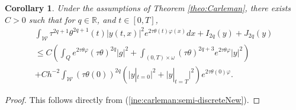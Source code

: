 \documentclass{amsart}
\numberwithin{equation}{section}
\newtheorem{corollary}[theorem]{Corollary}
\begin{document}
\begin{corollary}\label{ine:Carleman:semi-discreteNew2}
Under the assumptions of Theorem \ref{theo:Carleman}, there exists $C>0$ such that for $q\in\mathbb{R}$, and $t\in [0,T]$,
\begin{multline*}
    \int_{\mathcal{W}}\tau^{2q+1}\theta^{2q+1}\left(t\right)\left|y\left(t,x\right)\right|^2e^{2\tau\theta(t)\varphi(x)}dx+I_{2q}(y)+J_{2q}(y)
    \\
    \leq  C\left(\int_Qe^{2\tau\theta\varphi}(\tau\theta)^{2q}|g|^2+\int_{(0,T)\times\omega}(\tau\theta)^{2q+3}e^{2\tau\theta\varphi}|y|^2\right) \\
    +Ch^{-2}\int_{\mathcal{W}} (\tau\theta(0))^{2q}\left(\Big|y|_{t=0}\Big|^2+\Big|y|_{t=T}\Big|^2\right)e^{2\tau\theta(0)\varphi}.
\end{multline*}
\end{corollary}
\begin{proof}
   This follows directly from (\ref{ine:carleman:semi-discreteNew}).
\end{proof}
\end{document}
